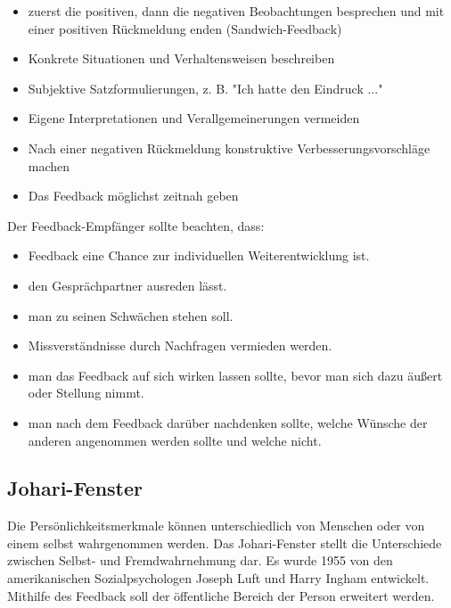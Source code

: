 \begin{itemize}
    \item zuerst die positiven, dann die negativen Beobachtungen besprechen und mit einer positiven Rückmeldung enden (Sandwich-Feedback)
    \item Konkrete Situationen und Verhaltensweisen beschreiben
    \item Subjektive Satzformulierungen, z. B. "Ich hatte den Eindruck ..."
    \item Eigene Interpretationen und Verallgemeinerungen vermeiden
    \item Nach einer negativen Rückmeldung konstruktive Verbesserungsvorschläge machen
    \item Das Feedback möglichst zeitnah geben
\end{itemize}

Der Feedback-Empfänger sollte beachten, dass:
\begin{itemize}
    \item Feedback eine Chance zur individuellen Weiterentwicklung ist.
    \item den Gesprächpartner ausreden lässt.
    \item man zu seinen Schwächen stehen soll.
    \item Missverständnisse durch Nachfragen vermieden werden.
    \item man das Feedback auf sich wirken lassen sollte, bevor man sich dazu äußert oder Stellung nimmt.
    \item man nach dem Feedback darüber nachdenken sollte, welche Wünsche der anderen angenommen werden sollte und welche nicht.
\end{itemize}

\subsection{Johari-Fenster}
Die Persönlichkeitsmerkmale können unterschiedlich von Menschen oder von einem selbst wahrgenommen werden.
Das Johari-Fenster stellt die Unterschiede zwischen Selbst- und Fremdwahrnehmung dar. 
Es wurde 1955 von den amerikanischen Sozialpsychologen Joseph Luft und Harry Ingham entwickelt. Mithilfe des 
Feedback soll der öffentliche Bereich der Person erweitert werden.


